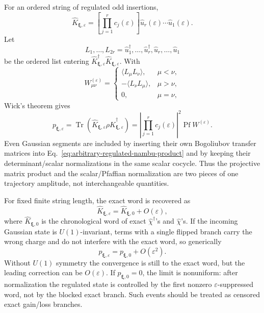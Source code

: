 \documentclass[aps,prb,onecolumn,nofootinbib,superscriptaddress]{revtex4-2}
\newcommand{\Tr}{\operatorname{Tr}}
\newcommand{\bxi}{{\boldsymbol{\xi}}}
\theoremstyle{plain}
\theoremstyle{definition}
\begin{document}
For an ordered string of regulated odd insertions,
\begin{equation}
  \hat K_{\bxi,\varepsilon}
  =
  \left[\prod_{j=1}^r c_j(\varepsilon)\right]
  \hat u_r(\varepsilon)\cdots\hat u_1(\varepsilon) .
  \label{eq:regulated-string-factorization}
\end{equation}
Let
\begin{equation}
  L_1,\ldots,L_{2r}
  =
  \hat u_1^\dagger,\ldots,\hat u_r^\dagger,
  \hat u_r,\ldots,\hat u_1
  \label{eq:regulated-product-L-list}
\end{equation}
be the ordered list entering
\(\hat K_{\bxi,\varepsilon}^\dagger\hat K_{\bxi,\varepsilon}\).  With
\begin{equation}
  W_{\mu\nu}^{(\varepsilon)}=
  \begin{cases}
    \langle L_\mu L_\nu\rangle, & \mu<\nu,\\
    -\langle L_\nu L_\mu\rangle, & \mu>\nu,\\
    0, & \mu=\nu,
  \end{cases}
  \label{eq:regulated-product-wick-matrix}
\end{equation}
Wick's theorem gives
\begin{equation}
  p_{\bxi,\varepsilon}
  =
  \Tr(\hat K_{\bxi,\varepsilon}\rho
  \hat K_{\bxi,\varepsilon}^\dagger)
  =
  \left|\prod_{j=1}^r c_j(\varepsilon)\right|^2
  \operatorname{Pf}W^{(\varepsilon)} .
  \label{eq:regulated-product-born-pfaffian}
\end{equation}
Even Gaussian segments are included by inserting their own Bogoliubov transfer
matrices into Eq.~\eqref{eq:arbitrary-regulated-nambu-product} and by keeping
their determinant/scalar normalizations in the same scalar cocycle.  Thus the
projective matrix product and the scalar/Pfaffian normalization are two pieces
of one trajectory amplitude, not interchangeable quantities.

For fixed finite string length, the exact word is recovered as
\begin{equation}
  \hat K_{\bxi,\varepsilon}=\hat K_{\bxi,0}+O(\varepsilon),
  \label{eq:regulated-word-limit}
\end{equation}
where \(\hat K_{\bxi,0}\) is the chronological word of exact
\(\hat\chi^\dagger\)'s and \(\hat\chi\)'s.  If the incoming Gaussian state is
\(U(1)\)-invariant, terms with a single flipped branch carry the wrong charge
and do not interfere with the exact word, so generically
\begin{equation}
  p_{\bxi,\varepsilon}=p_{\bxi,0}+O(\varepsilon^2).
  \label{eq:regulated-born-limit}
\end{equation}
Without \(U(1)\) symmetry the convergence is still to the exact word, but the
leading correction can be \(O(\varepsilon)\).  If \(p_{\bxi,0}=0\), the limit
is nonuniform: after normalization the regulated state is controlled by the
first nonzero \(\varepsilon\)-suppressed word, not by the blocked exact branch.
Such events should be treated as censored exact gain/loss branches.
\end{document}
